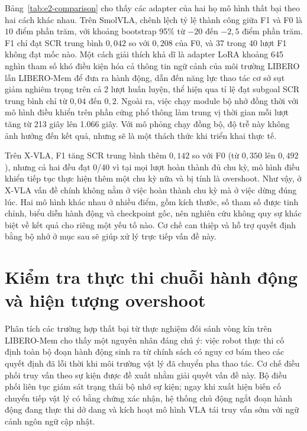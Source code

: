Bảng~\ref{tab:e2-comparison} cho thấy các adapter của hai họ mô hình thất bại theo hai cách khác nhau. Trên SmolVLA, chênh lệch tỷ lệ thành công giữa F1 và F0 là $10$ điểm phần trăm, với khoảng bootstrap 95\% từ $-20$ đến $-2{,}5$ điểm phần trăm. F1 chỉ đạt SCR trung bình $0{,}042$ so với $0{,}208$ của F0, và 37 trong 40 lượt F1 không đạt mốc nào. Một cách giải thích khả dĩ là adapter LoRA khoảng 645 nghìn tham số khó điều kiện hóa cả thông tin ngữ cảnh của môi trường LIBERO lẫn LIBERO-Mem để đưa ra hành động, dẫn đến năng lực thao tác cơ sở sụt giảm nghiêm trọng trên cả 2 lượt huấn luyện, thể hiện qua tỉ lệ đạt subgoal SCR trung bình chỉ từ $0{,}04$ đến $0{,}2$. Ngoài ra, việc chạy module bộ nhớ đồng thời với mô hình điều khiển trên phần cứng phổ thông làm trung vị thời gian mỗi lượt tăng từ 213 giây lên 1.066 giây. Với mô phỏng chạy đồng bộ, độ trễ này không ảnh hưởng đến kết quả, nhưng sẽ là một thách thức khi triển khai thực tế.

Trên X-VLA, F1 tăng SCR trung bình thêm $0{,}142$ so với F0 (từ $0{,}350$ lên $0{,}492$), nhưng cả hai đều đạt 0/40 vì tại mọi lượt hoàn thành đủ chu kỳ, mô hình điều khiển tiếp tục thực hiện thêm một chu kỳ nữa và bị tính là overshoot. Như vậy, ở X-VLA vấn đề chính không nằm ở việc hoàn thành chu kỳ mà ở việc dừng đúng lúc. Hai mô hình khác nhau ở nhiều điểm, gồm kích thước, số tham số được tinh chỉnh, biểu diễn hành động và checkpoint gốc, nên nghiên cứu không quy sự khác biệt về kết quả cho riêng một yếu tố nào. Cơ chế can thiệp và hỗ trợ quyết định bằng bộ nhớ ở mục sau sẽ giúp xử lý trực tiếp vấn đề này.

\section{Kiểm tra thực thi chuỗi hành động và hiện tượng overshoot}
\label{sec:d2-evidence}
\label{sec:d2-calibration}

Phân tích các trường hợp thất bại từ thực nghiệm đối sánh vòng kín trên LIBERO-Mem cho thấy một nguyên nhân đáng chú ý: việc robot thực thi cố định toàn bộ đoạn hành động sinh ra từ chính sách có nguy cơ bám theo các quyết định đã lỗi thời khi môi trường vật lý đã chuyển pha thao tác. Cơ chế điều phối truy vấn theo sự kiện được đề xuất nhằm giải quyết vấn đề này. Bộ điều phối liên tục giám sát trạng thái bộ nhớ sự kiện; ngay khi xuất hiện biến cố chuyển tiếp vật lý có bằng chứng xác nhận, hệ thống chủ động ngắt đoạn hành động đang thực thi dở dang và kích hoạt mô hình VLA tái truy vấn sớm với ngữ cảnh ngôn ngữ cập nhật.

